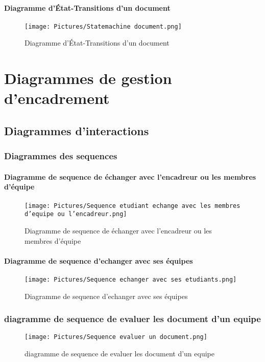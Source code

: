 \documentclass[11pt,fleqn]{book} %
\begin{document}
\subsubsection{Diagramme d’État-Transitions d'un document}
\begin{figure}[h]
    \centering
    \texttt{[image: Pictures/Statemachine document.png]}
    \caption{Diagramme d’État-Transitions d'un document}
    \label{fig:pca}
\end{figure}

\chapter{Diagrammes de gestion d'encadrement}
\section{Diagrammes d'interactions}
\subsection{Diagrammes des sequences}
\newpage
\subsubsection{Diagramme de sequence de échanger avec l'encadreur ou les membres d'équipe}
\begin{figure}[h]
    \centering
    \texttt{[image: Pictures/Sequence etudiant echange avec les membres d'equipe ou l'encadreur.png]}
    \caption{Diagramme de sequence de échanger avec l'encadreur ou les membres d'équipe}
    \label{fig:pca}
\end{figure}
\newpage
\subsubsection{Diagramme de sequence d'echanger avec ses équipes}
\begin{figure}[h]
    \centering
    \texttt{[image: Pictures/Sequence echanger avec ses etudiants.png]}
    \caption{Diagramme de sequence d'echanger avec ses équipes}
    \label{fig:pca}
\end{figure}
\newpage
\subsection{diagramme de sequence de evaluer les document d'un equipe}
\begin{figure}[h]
    \centering
    \texttt{[image: Pictures/Sequence evaluer un document.png]}
    \caption{diagramme de sequence de evaluer les document d'un equipe}
    \label{fig:pca}
\end{figure}
\newpage
\end{document}

